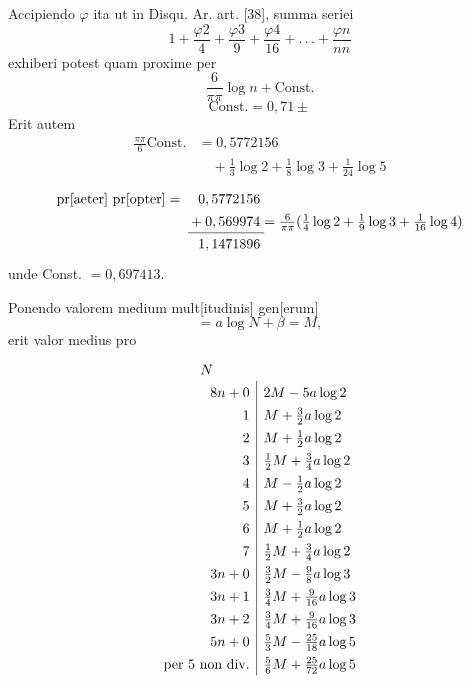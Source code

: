 \par\indent Accipiendo \(\varphi\) ita ut in Disqu. Ar. art. [38], summa seriei
\[
1+\frac{\varphi2}{4}+\frac{\varphi3}{9}+\frac{\varphi4}{16}+.\,.\,.+\frac{\varphi n}{nn}
\]
\noindent exhiberi potest quam proxime per
\[
\frac6{\pi\pi}\log n+\text{Const.}
\]
\[
\text{Const.}=0,71\pm
\]
\noindent Erit autem
\clearpage
{}
\[
\begin{aligned}
\frac{\pi\pi}{6}\text{Const.}&=0,5772156\\
&\quad+\tfrac13\log2+\tfrac18\log3+\tfrac1{24}\log5
\end{aligned}
\]
\[
\begin{array}{r@{\;}r@{\;}l}
\text{pr[aeter] pr[opter]}={}&0,5772156&\\
&{}+0,569974&=\frac6{\pi\pi}(\tfrac14\log2+\tfrac19\log3+\tfrac1{16}\log4)\\
\cline{2-2}
&1,1471896&
\end{array}
\]
\noindent unde Const. \(=0,697413\).
\ClosingRule
{}
\par\indent Ponendo valorem medium mult[itudinis] gen[erum]
\[
=a\log N+\beta=M,
\]
\noindent erit valor medius pro
\[
\renewcommand{\arraystretch}{1.35}
\begin{array}{r|l}
\multicolumn{1}{c}{N}&\\
8n+0&2M-5a\log2\\
1&M+\tfrac32a\log2\\
2&M+\tfrac12a\log2\\
3&\tfrac12M+\tfrac34a\log2\\
4&M-\tfrac12a\log2\\
5&M+\tfrac32a\log2\\
6&M+\tfrac12a\log2\\
7&\tfrac12M+\tfrac34a\log2\\
3n+0&\tfrac32M-\tfrac98a\log3\\
3n+1&\tfrac34M+\tfrac9{16}a\log3\\
3n+2&\tfrac34M+\tfrac9{16}a\log3\\
5n+0&\tfrac53M-\tfrac{25}{18}a\log5\\
\text{per 5 non div.}&\tfrac56M+\tfrac{25}{72}a\log5
\end{array}
\]
\ClosingRule
\clearpage
{}
